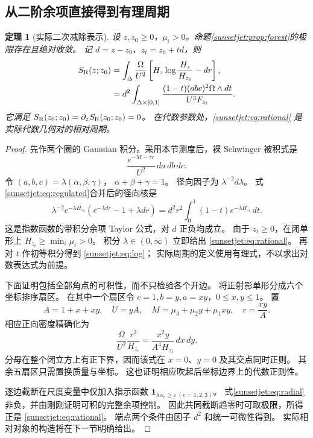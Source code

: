 \documentclass[11pt,a4paper,oneside]{ctexart}
\theoremstyle{cnplain}
\newtheorem{theorem}{定理}[section]
\theoremstyle{definition}
\theoremstyle{remark}
\numberwithin{equation}{section}
\begin{document}
\subsection{从二阶余项直接得到有理周期}
\begin{theorem}[实际二次减除表示]\label{sunsetjet:thm:period}
设 $z,z_0\geq0$，$\mu_i>0$。命题\ref{sunsetjet:prop:forest}的极限存在且绝对收敛。
记 $d=z-z_0$、$z_t=z_0+td$，则
\begin{align}
 S_{\mathrm R}(z;z_0)
 &=\int_\Delta\frac{\Omega}{U^2}
       \left[H_z\log\frac{H_z}{H_{z_0}}-d r\right],\label{sunsetjet:eq:log}\\
 &=d^2\int_{\Delta\times[0,1]}
       \frac{(1-t)(abc)^2\Omega\wedge dt}{U^3F_{z_t}}.\label{sunsetjet:eq:rational}
\end{align}
它满足 $S_{\mathrm R}(z_0;z_0)=\partial_zS_{\mathrm R}(z_0;z_0)=0$。
在代数参数处，\eqref{sunsetjet:eq:rational} 是实际代数几何对的相对周期。
\end{theorem}
\begin{proof}
先作两个圈的 Gaussian 积分。采用本节测度后，裸 Schwinger 被积式是
\[
 \frac{e^{-M-zr}}{U^2}\,da\,db\,dc.
\]
令 $(a,b,c)=\lambda(\alpha,\beta,\gamma)$，
$\alpha+\beta+\gamma=1$。
径向因子为 $\lambda^{-2}d\lambda$。
式\eqref{sunsetjet:eq:regulated}合并后的径向核是
\begin{equation}\label{sunsetjet:eq:radial}
 \lambda^{-2}e^{-\lambda H_{z_0}}
       \left(e^{-\lambda d r}-1+\lambda d r\right)
 =d^2r^2\int_0^1(1-t)e^{-\lambda H_{z_t}}\,dt.
\end{equation}
这是指数函数的带积分余项 Taylor 公式，对 $d$ 正负均成立。
由于 $z_t\geq0$，在闭单形上 $H_{z_t}\geq\min_i\mu_i>0$。
积分 $\lambda\in(0,\infty)$ 立即给出 \eqref{sunsetjet:eq:rational}。
再对 $t$ 作初等积分得到 \eqref{sunsetjet:eq:log}；
实际周期的定义使用有理式，不以求出对数表达式为前提。

下面证明包括全部角点的可积性，而不只检验各个开边。
将正射影单形分成六个坐标排序扇区。
在其中一个扇区令 $c=1,b=y,a=xy$，$0\leq x,y\leq1$。
置
\[
 A=1+x+xy,\quad U=yA,\quad
 M=\mu_3+\mu_2y+\mu_1xy,\quad r=\frac{xy}{A}.
\]
相应正向密度精确化为
\begin{equation}\label{sunsetjet:eq:sector}
 \frac{\Omega}{U^2}\frac{r^2}{H_{z_t}}
   =\frac{x^2y}{A^4H_{z_t}}\,dx\,dy.
\end{equation}
分母在整个闭立方上有正下界，因而该式在 $x=0$、$y=0$ 及其交点同时正则。
其余五扇区只需置换质量与坐标。
这也证明相应吹起后坐标边界上的代数正则性。

逐边截断在尺度变量中仅加入指示函数
$\mathbf1_{\lambda\alpha_e\geq\varepsilon\ (e=1,2,3)}$。
式\eqref{sunsetjet:eq:radial}非负，并由刚刚证明可积的完整余项控制。
因此共同截断趋零时可取极限，所得正是 \eqref{sunsetjet:eq:rational}。
端点两个条件由因子 $d^2$ 和统一可微性得到。
实际相对对象的构造将在下一节明确给出。
\end{proof}
\end{document}
